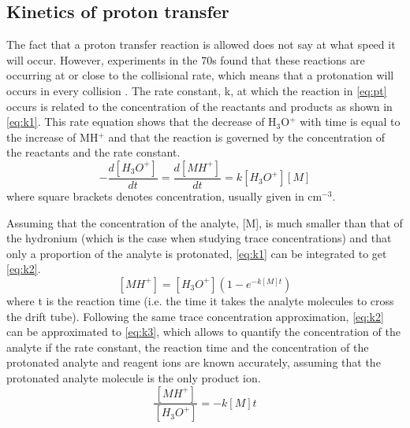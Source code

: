 \subsection{Kinetics of proton transfer}
The fact that a proton transfer reaction is allowed  does not say at what speed it will occur. %
%
However, \citeauthor{schiff1975flowing} experiments in the 70s found that these reactions are occurring at or close to the collisional rate, which means that a protonation will occurs in every collision \cite{schiff1975flowing}.
%
The rate constant, \acrshort{k}, at which  the reaction in \autoref{eq:pt} occurs is
related to the concentration of the reactants and products as %
shown in \autoref{eq:k1}. This rate equation shows that the decrease of H$_3$O$^+$ with time is equal to the increase of MH$^+$ and that the reaction is governed by the concentration  of the reactants and the rate constant.
\begin{equation}
\label{eq:k1}
-\frac{d[H_3 O^+ ]}{dt} = \frac{d[MH^+]}{dt} = k[H_3 O^+ ][M]
\end{equation}
where square brackets denotes concentration, usually given in cm$^{-3}$.

Assuming that the concentration of the analyte, [M], is much smaller than that of the hydronium (which is the case when studying trace concentrations) and that only a  proportion of the analyte is protonated, \autoref{eq:k1} can be integrated to get \autoref{eq:k2}.
\begin{equation}
\label{eq:k2}
[MH^+] = [H_3O^+]\left(1-e^{-k[M]t}\right)
\end{equation}
where t is the reaction time (i.e. the time it takes the analyte molecules to cross the drift tube).
%
Following the same trace concentration approximation, \autoref{eq:k2} can be approximated to \autoref{eq:k3}, which allows to quantify the concentration of the analyte if the rate constant, the reaction time and the concentration of the protonated analyte and reagent ions are known accurately, assuming that the protonated analyte molecule is the only product ion.
\begin{equation}
\label{eq:k3}
\frac{[MH^+]}{[H_3O^+]} = -k[M]t
\end{equation}




